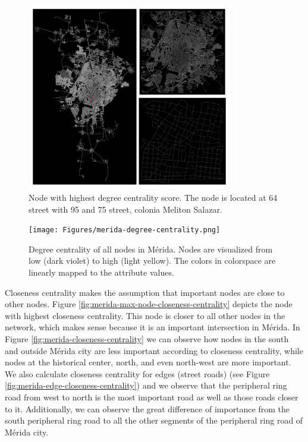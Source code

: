 \begin{figure}[h!]
	\centering
	\includegraphics[width=0.8\textwidth]{Figures/merida-node-degree-centrality.png}
	\caption{Node with highest degree centrality score. The node is located at 64 street with 95 and 75 street, colonia Meliton Salazar.
		\label{fig:merida-max-node-degree-centrality}}
\end{figure}

\begin{figure}[h!]
	\centering
	\texttt{[image: Figures/merida-degree-centrality.png]}
	\caption{Degree centrality of all nodes in Mérida. Nodes are visualized from low (dark violet) to high (light yellow). The colors in colorspace are linearly mapped to the attribute values.
		\label{fig:merida-degree-centrality}}
\end{figure}

Closeness centrality makes the assumption that important nodes are close to other nodes. Figure \ref{fig:merida-max-node-closeness-centrality} depicts the node with highest closeness centrality. This node is closer to all other nodes in the network, which makes sense because it is an important intersection in Mérida. In Figure \ref{fig:merida-closeness-centrality} we can observe how nodes in the south and outside Mérida city are less important according to closeness centrality, while nodes at the historical center, north, and even north-west are more important. We also calculate closeness centrality for edges (street roads) (see Figure \ref{fig:merida-edge-closeness-centrality}) and we observe that the peripheral ring road from west to north is the most important road as well as those roads closer to it. Additionally, we can observe the great difference of importance from the south peripheral ring road to all the other segments of the peripheral ring road of Mérida city.

